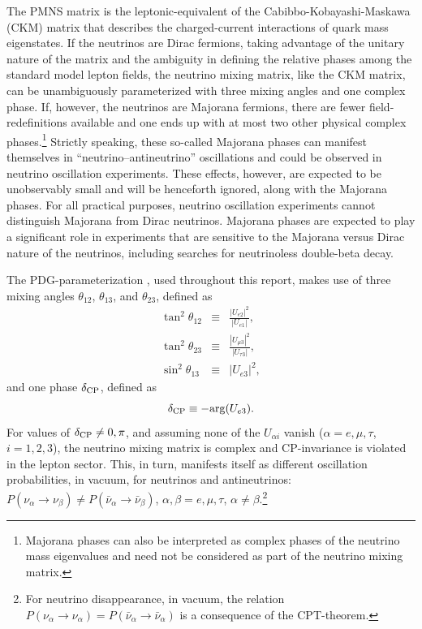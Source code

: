 The PMNS matrix is the leptonic-equivalent of the Cabibbo-Kobayashi-Maskawa (CKM) matrix that describes the charged-current interactions of quark mass eigenstates. If the neutrinos are Dirac fermions, taking advantage of the unitary nature of the matrix and the ambiguity in defining the relative phases among the standard model lepton fields, the neutrino mixing matrix, like the CKM matrix, can be unambiguously parameterized with three mixing angles and one complex phase. If, however, the neutrinos are Majorana fermions, there are fewer field-redefinitions available and one ends up with at most two other physical complex phases.\footnote{Majorana phases can also be interpreted as complex phases of the neutrino mass eigenvalues and need not be considered as part of the neutrino mixing matrix.}  Strictly speaking, these so-called Majorana phases can manifest themselves in ``neutrino--antineutrino'' oscillations \cite{deGouvea:2002gf} and could be observed in neutrino oscillation experiments. These effects, however, are expected to be unobservably small and will be henceforth ignored, along with the Majorana phases. For all practical purposes, neutrino oscillation experiments cannot distinguish Majorana from Dirac neutrinos. Majorana phases are expected to play a significant role in experiments that are sensitive to the Majorana versus Dirac nature of the neutrinos, including searches for neutrinoless double-beta decay. 

The PDG-parameterization \cite{Tanabashi:2018oca}, used throughout this report, makes use of three mixing angles $\theta_{12}$, $\theta_{13}$, and $\theta_{23}$, defined as
\begin{eqnarray}
\tan^2\theta_{12} &\equiv& \frac{|U_{e2}|^2}{|U_{e1}|}, \\
\tan^2\theta_{23} &\equiv& \frac{|U_{\mu3}|^2}{|U_{\tau3}|}, \\
\sin^2\theta_{13} &\equiv& |U_{e3}|^2,
\end{eqnarray} 
and one phase $\delta_{\rm CP}$, defined as
\begin{equation}
\delta_{\rm CP} \equiv -{\rm arg}(U_{e3}).
\end{equation}
For values of $\delta_{\rm CP}\neq 0,\pi$, and assuming none of the $U_{\alpha i}$ vanish ($\alpha=e,\mu,\tau$, $i=1,2,3$), the neutrino mixing matrix is complex and CP-invariance is violated in the lepton sector. This, in turn, manifests itself as different oscillation probabilities, in vacuum, for neutrinos and antineutrinos: $P(\nu_{\alpha}\to\nu_{\beta})\neq P(\bar{\nu}_{\alpha}\to\bar{\nu}_{\beta})$, $\alpha,\beta=e,\mu,\tau$, $\alpha\neq\beta$.\footnote{For neutrino disappearance, in vacuum, the relation $P(\nu_{\alpha}\to\nu_{\alpha}) =P(\bar{\nu}_{\alpha}\to\bar{\nu}_{\alpha})$ is a consequence of the CPT-theorem.} 

